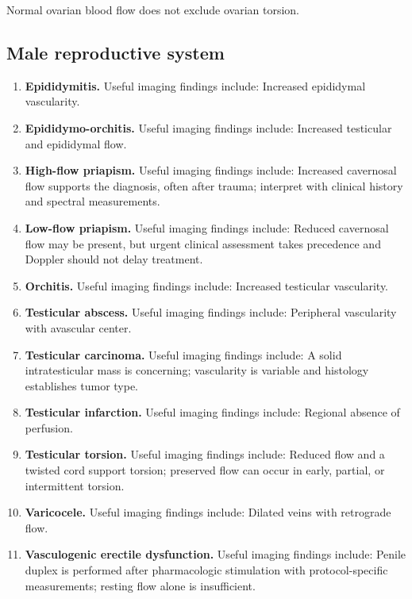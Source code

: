 Normal ovarian blood flow does not exclude ovarian torsion.

\subsection{Male reproductive system}
\begin{enumerate}[leftmargin=*,itemsep=0.45em,topsep=0.4em]
\item \textbf{Epididymitis.} Useful imaging findings include: Increased epididymal vascularity.
\item \textbf{Epididymo-orchitis.} Useful imaging findings include: Increased testicular and epididymal flow.
\item \textbf{High-flow priapism.} Useful imaging findings include: Increased cavernosal flow supports the diagnosis, often after trauma; interpret with clinical history and spectral measurements.
\item \textbf{Low-flow priapism.} Useful imaging findings include: Reduced cavernosal flow may be present, but urgent clinical assessment takes precedence and Doppler should not delay treatment.
\item \textbf{Orchitis.} Useful imaging findings include: Increased testicular vascularity.
\item \textbf{Testicular abscess.} Useful imaging findings include: Peripheral vascularity with avascular center.
\item \textbf{Testicular carcinoma.} Useful imaging findings include: A solid intratesticular mass is concerning; vascularity is variable and histology establishes tumor type.
\item \textbf{Testicular infarction.} Useful imaging findings include: Regional absence of perfusion.
\item \textbf{Testicular torsion.} Useful imaging findings include: Reduced flow and a twisted cord support torsion; preserved flow can occur in early, partial, or intermittent torsion.
\item \textbf{Varicocele.} Useful imaging findings include: Dilated veins with retrograde flow.
\item \textbf{Vasculogenic erectile dysfunction.} Useful imaging findings include: Penile duplex is performed after pharmacologic stimulation with protocol-specific measurements; resting flow alone is insufficient.
\end{enumerate}

